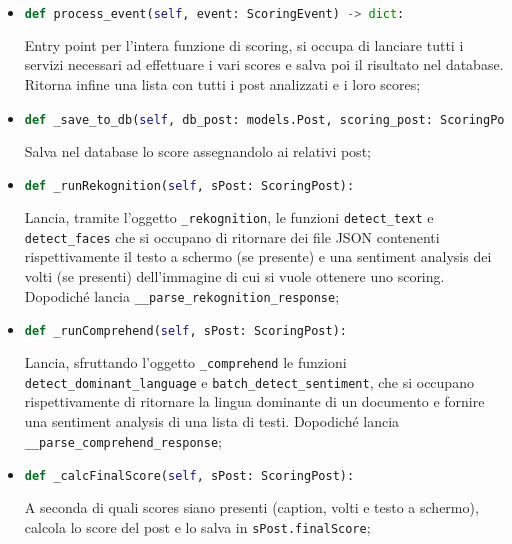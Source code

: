 \begin{itemize}
\item 
\begin{lstlisting}[language=Python, numbers=none]
def process_event(self, event: ScoringEvent) -> dict:
\end{lstlisting}
Entry point per l'intera funzione di scoring, si occupa di lanciare tutti i servizi 
necessari ad effettuare i vari scores e salva poi il risultato nel database. 
Ritorna infine una lista con tutti i post analizzati e i loro scores;

\item 
\begin{lstlisting}[language=Python, numbers=none]
def _save_to_db(self, db_post: models.Post, scoring_post: ScoringPost):
\end{lstlisting}
Salva nel database lo score assegnandolo ai relativi post;

\item 
\begin{lstlisting}[language=Python, numbers=none]
def _runRekognition(self, sPost: ScoringPost):
\end{lstlisting}
Lancia, tramite l'oggetto \verb+_rekognition+, le funzioni \verb+detect_text+ e 
\verb+detect_faces+ che si occupano di ritornare dei file JSON contenenti rispettivamente 
il testo a schermo (se presente) e una sentiment analysis dei volti (se presenti) 
dell'immagine di cui si vuole ottenere uno scoring. 
Dopodiché lancia \verb+__parse_rekognition_response+;

\item 
\begin{lstlisting}[language=Python, numbers=none]
def _runComprehend(self, sPost: ScoringPost):
\end{lstlisting}
Lancia, sfruttando l'oggetto \verb+_comprehend+ le funzioni \verb+detect_dominant_language+ 
e \verb+batch_detect_sentiment+, che si occupano rispettivamente di ritornare la lingua 
dominante di un documento e fornire una sentiment analysis di una lista di testi.
Dopodiché  lancia \verb+__parse_comprehend_response+;

\item 
\begin{lstlisting}[language=Python, numbers=none]
def _calcFinalScore(self, sPost: ScoringPost):
\end{lstlisting}
A seconda di quali scores siano presenti (caption, volti e testo a schermo), calcola 
lo score del post e lo salva in \verb+sPost.finalScore+;
   


\end{itemize}
